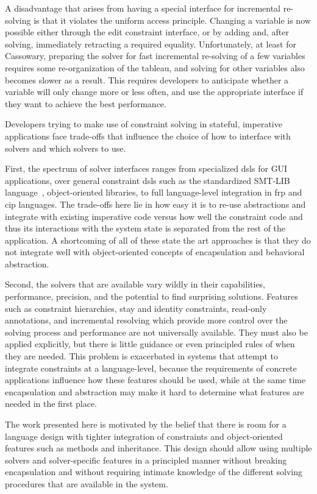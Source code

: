 A disadvantage that arises from having a special interface for
incremental re-solving is that it violates the uniform access
principle. Changing a variable is now possible either through the edit
constraint interface, or by adding and, after solving, immediately
retracting a required equality. Unfortunately, at least for Cassowary,
preparing the solver for fast incremental re-solving of a few
variables requires some re-organization of the tableau, and solving
for other variables also becomes slower as a result. This requires
developers to anticipate whether a variable will only change more or
less often, and use the appropriate interface if they want to achieve
the best performance.

\SummarySep

Developers trying to make use of constraint solving in stateful, imperative
applications face trade-offs that influence the choice of how to interface with
solvers and which solvers to use.

First, the spectrum of solver interfaces ranges from specialized \acp{dsl} for
GUI applications, over general constraint \acp{dsl} such as the standardized
SMT-LIB language~\cite{BarFT-RR-15}, object-oriented libraries, to full
language-level integration in \ac{frp} and \ac{cip} languages. The trade-offs
here lie in how easy it is to re-use abstractions and integrate with existing
imperative code versus how well the constraint code and thus its interactions
with the system state is separated from the rest of the application. A
shortcoming of all of these state the art approaches is that they do not
integrate well with object-oriented concepts of encapsulation and behavioral
abstraction.

Second, the solvers that are available vary wildly in their capabilities,
performance, precision, and the potential to find surprising solutions. Features
such as constraint hierarchies, stay and identity constraints, read-only
annotations, and incremental resolving which provide more control over the
solving process and performance are not universally available. They must also be
applied explicitly, but there is little guidance or even principled rules of
when they are needed. This problem is exacerbated in systems that attempt to
integrate constraints at a language-level, because the requirements of concrete
applications influence how these features should be used, while at the same time
encapsulation and abstraction may make it hard to determine what features are
needed in the first place.

The work presented here is motivated by the belief that there is room for a
language design with tighter integration of constraints and object-oriented
features such as methods and inheritance. This design should allow using
multiple solvers and solver-specific features in a principled manner without
breaking encapsulation and without requiring intimate knowledge of the different
solving procedures that are available in the system.

